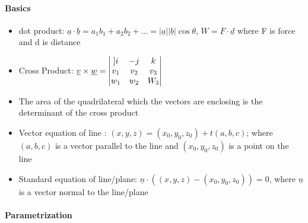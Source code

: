 \documentclass[10pt, twocolumn]{article}
\begin{document}
\paragraph{Basics}
\begin{itemize}
	\item dot product: $\underline{a} \cdot \underline{b} = a_1 b_1 + a_2b_2 + ... = |\underline{a}| |\underline{b}| \cos{\theta} $, $W = \underline{F} \cdot \underline{d}$ where F is force and d is distance
	\item Cross Product: $\underline{v} \times \underline{w} = \begin{vmatrix} ]
																	i & -j & k \\ 
																	v_1 & v_2 & v_3 \\ 
																	w_1 & w_2 & W_3 \notag
																\end{vmatrix}$ 
	\item The area of the quadrilateral which the vectors are enclosing is the determinant of the cross product
	\item Vector equation of line : $(x, y, z) = (x_0, y_0, z_0) + t (a, b, c)$; where $(a, b, c)$ is a vector parallel to the line and $(x_0, y_0, z_0)$ is a point on the line
	\item Standard equation of line/plane: $\underline{n} \cdot ((x, y, z) - (x_0, y_0, z_0)) = 0$, where $\underline{n}$ is a vector normal to the line/plane
\end{itemize}

\paragraph{Parametrization}
\end{document}
